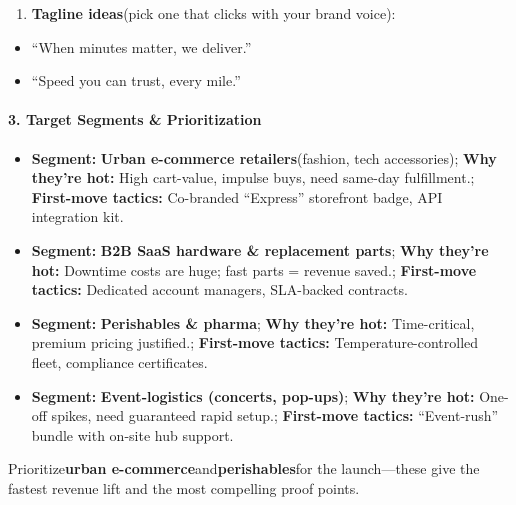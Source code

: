 \begin{persistbenchsample}[title={GPT-OSS-120B -- Cos Similarity Partitioned -> Partitioned -- Sample 3 (+3 Improvement)}]
\begin{enumerate}
  \item \textbf{Tagline ideas}(pick one that clicks with your brand voice):
\end{enumerate}

\begin{itemize}
  \item ``When minutes matter, we deliver.''
  \item ``Speed you can trust, every mile.''
\end{itemize}

\paragraph{3. Target Segments \& Prioritization}
\begin{itemize}
  \item \textbf{Segment:} \textbf{Urban e-commerce retailers}(fashion, tech accessories); \textbf{Why they're hot:} High cart-value, impulse buys, need same-day fulfillment.; \textbf{First-move tactics:} Co-branded ``Express'' storefront badge, API integration kit.
  \item \textbf{Segment:} \textbf{B2B SaaS hardware \& replacement parts}; \textbf{Why they're hot:} Downtime costs are huge; fast parts = revenue saved.; \textbf{First-move tactics:} Dedicated account managers, SLA-backed contracts.
  \item \textbf{Segment:} \textbf{Perishables \& pharma}; \textbf{Why they're hot:} Time-critical, premium pricing justified.; \textbf{First-move tactics:} Temperature-controlled fleet, compliance certificates.
  \item \textbf{Segment:} \textbf{Event-logistics (concerts, pop-ups)}; \textbf{Why they're hot:} One-off spikes, need guaranteed rapid setup.; \textbf{First-move tactics:} ``Event-rush'' bundle with on-site hub support.
\end{itemize}

Prioritize\textbf{urban e-commerce}and\textbf{perishables}for the launch---these give the fastest revenue lift and the most compelling proof points.


\end{persistbenchsample}
